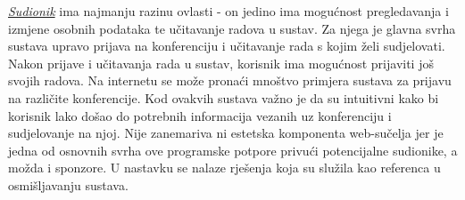 		\indent \underline{\textit{Sudionik}} ima najmanju razinu ovlasti - on jedino ima mogućnost pregledavanja i izmjene osobnih podataka te učitavanje radova u sustav. Za njega je glavna svrha sustava upravo prijava na konferenciju i učitavanje rada s kojim želi sudjelovati. Nakon prijave i učitavanja rada u sustav, korisnik ima mogućnost prijaviti još svojih radova.
		\newline
		\newline
		\indent Na internetu se može pronaći mnoštvo primjera sustava za prijavu na različite konferencije. Kod ovakvih sustava važno je da su intuitivni kako bi korisnik lako došao do potrebnih informacija vezanih uz konferenciju i sudjelovanje na njoj. Nije zanemariva ni estetska komponenta web-sučelja jer je jedna od osnovnih svrha ove programske potpore privući potencijalne sudionike, a možda i sponzore. U nastavku se nalaze rješenja koja su služila kao referenca u osmišljavanju sustava.
		\newline
		\newline
		
